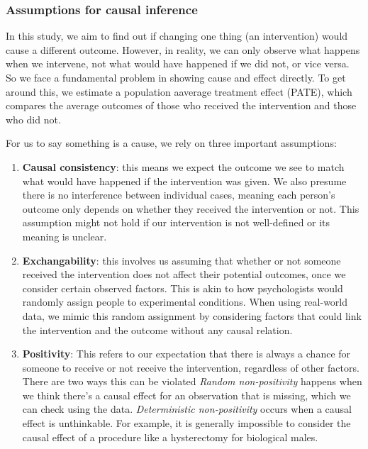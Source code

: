 \documentclass[
  singlecolumn,
  9pt]{article}
\begin{document}
\subsubsection{Assumptions for causal
inference}\label{assumptions-for-causal-inference}

In this study, we aim to find out if changing one thing (an
intervention) would cause a different outcome. However, in reality, we
can only observe what happens when we intervene, not what would have
happened if we did not, or vice versa. So we face a fundamental problem
in showing cause and effect directly. To get around this, we estimate a
population aaverage treatment effect (PATE), which compares the average
outcomes of those who received the intervention and those who did not.

For us to say something is a cause, we rely on three important
assumptions:

\begin{enumerate}
\def\labelenumi{\arabic{enumi}.}
\item
  \textbf{Causal consistency}: this means we expect the outcome we see
  to match what would have happened if the intervention was given. We
  also presume there is no interference between individual cases,
  meaning each person's outcome only depends on whether they received
  the intervention or not. This assumption might not hold if our
  intervention is not well-defined or its meaning is unclear.
\item
  \textbf{Exchangability}: this involves us assuming that whether or not
  someone received the intervention does not affect their potential
  outcomes, once we consider certain observed factors. This is akin to
  how psychologists would randomly assign people to experimental
  conditions. When using real-world data, we mimic this random
  assignment by considering factors that could link the intervention and
  the outcome without any causal relation.
\item
  \textbf{Positivity}: This refers to our expectation that there is
  always a chance for someone to receive or not receive the
  intervention, regardless of other factors. There are two ways this can
  be violated \emph{Random non-positivity} happens when we think there's
  a causal effect for an observation that is missing, which we can check
  using the data. \emph{Deterministic non-positivity} occurs when a
  causal effect is unthinkable. For example, it is generally impossible
  to consider the causal effect of a procedure like a hysterectomy for
  biological males.
\end{enumerate}
\end{document}
